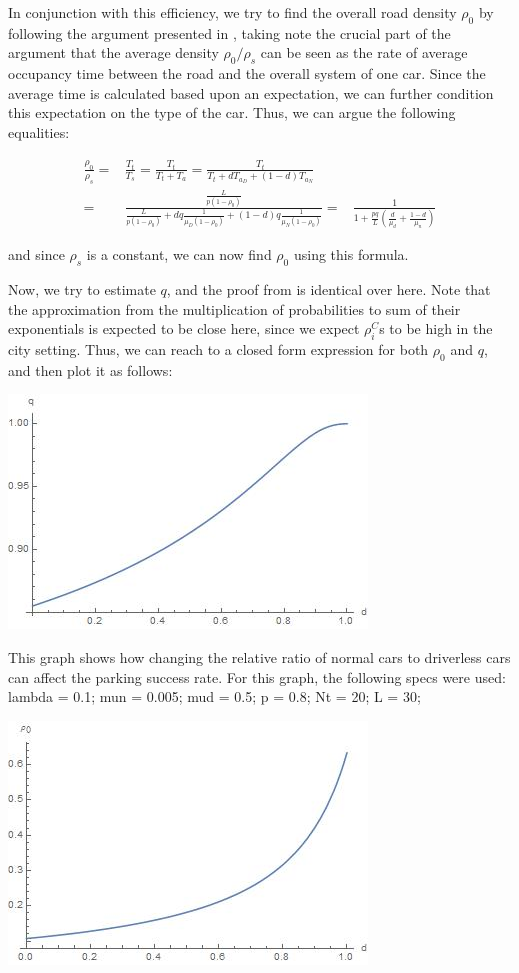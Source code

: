 \documentclass[]{article}
\begin{document}
In conjunction with this efficiency, we try to find the overall road density $\rho_0$ by following the argument presented in \cite{adsorption}, taking note the crucial part of the argument that the average density $\rho_0/\rho_s$ can be seen as the rate of average occupancy time between the road and the overall system of one car. Since the average time is calculated based upon an expectation, we can further condition this expectation on the type of the car. Thus, we can argue the following equalities:

\begin{align}
\frac{\rho_0}{\rho_s} =& \frac{T_t}{T_s} = \frac{T_t}{T_t + T_a} = \frac{T_t}{T_t + d T_{a_D} + (1 - d) T_{a_N}}\\
	=& \frac{\frac{L}{p (1 - \rho_0)}}{\frac{L}{p (1 - \rho_0)} + d q \frac{1}{\mu_D (1 - \rho_0)} + (1 - d) q \frac{1}{\mu_N (1 - \rho_0)}}
	=& \frac{1}{1 + \frac{pq}{L} (\frac{d}{\mu_d} + \frac{1-d}{\mu_n})}
\end{align}

and since $\rho_s$ is a constant, we can now find $\rho_0$ using this formula.

Now, we try to estimate $q$, and the proof from \cite{adsorption} is identical over here. Note that the approximation from the multiplication of probabilities to sum of their exponentials is expected to be close here, since we expect $\rho_i^C$s to be high in the city setting. Thus, we can reach to a closed form expression for both $\rho_0$ and $q$, and then plot it as follows:

\includegraphics{graph1.jpg}


This graph shows how changing the relative ratio of normal cars to driverless cars can affect the parking success rate. For this graph, the following specs were used:
lambda = 0.1;
mun = 0.005;
mud = 0.5;
p = 0.8;
Nt = 20;
L = 30;

\includegraphics{graph2.jpg}
\end{document}
